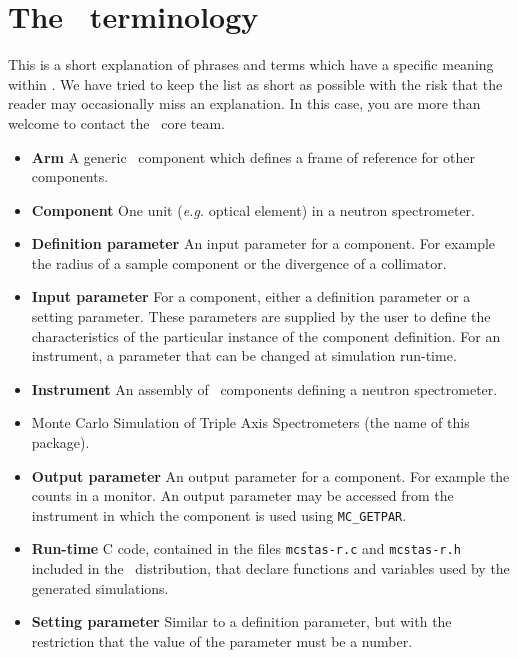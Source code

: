 
\chapter{The \MCS\ terminology}
\label{s:terminology}

This is a short explanation of phrases and terms which have a specific
meaning within \MCS. We have tried to keep the list as short
as possible with the risk that the reader may occasionally miss
an explanation. In this case, you are more than welcome to contact
the \MCS\ core team.

\noindent
\begin{itemize}
\item{\bf Arm}  A generic \MCS\ component which defines a frame of reference
      for other components. 
\item{\bf Component} One unit ({\em e.g.} optical element) in a neutron
      spectrometer.
\item{\bf Definition parameter} An input parameter for a component. For
  example the radius of a sample component or the divergence of a collimator.
\item{\bf Input parameter} For a component, either a definition parameter
or a setting parameter. These parameters are supplied by the user to
define the characteristics of the particular instance of the component
definition. For an instrument, a parameter that can be changed at
simulation run-time.
\item{\bf Instrument} An assembly of \MCS\ components defining
      a neutron spectrometer.
\item{\bf \MCS} Monte Carlo Simulation of Triple Axis Spectrometers
       (the name of this package).
\item{\bf Output parameter} An output parameter for a component.
  For example the counts in a monitor. An output parameter may be
  accessed from the instrument in which the component is used using
  \verb`MC_GETPAR`.
\item{\bf Run-time} C code, contained in the files
  \verb+mcstas-r.c+ and \verb+mcstas-r.h+ included in the \MCS\
  distribution, that declare functions and variables used by the
  generated simulations.
\item{\bf Setting parameter} Similar to a definition parameter, but with the
  restriction that the value of the parameter must be a number.
\end{itemize}
